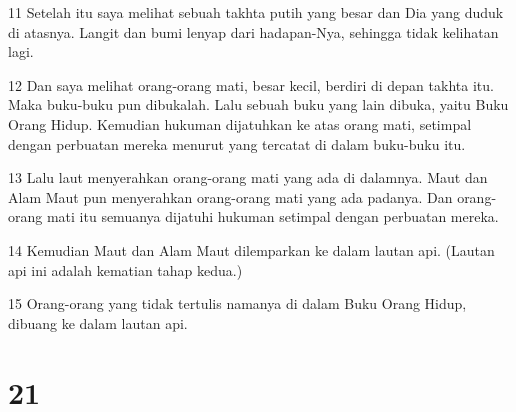 \par 11 Setelah itu saya melihat sebuah takhta putih yang besar dan Dia yang duduk di atasnya. Langit dan bumi lenyap dari hadapan-Nya, sehingga tidak kelihatan lagi.
\par 12 Dan saya melihat orang-orang mati, besar kecil, berdiri di depan takhta itu. Maka buku-buku pun dibukalah. Lalu sebuah buku yang lain dibuka, yaitu Buku Orang Hidup. Kemudian hukuman dijatuhkan ke atas orang mati, setimpal dengan perbuatan mereka menurut yang tercatat di dalam buku-buku itu.
\par 13 Lalu laut menyerahkan orang-orang mati yang ada di dalamnya. Maut dan Alam Maut pun menyerahkan orang-orang mati yang ada padanya. Dan orang-orang mati itu semuanya dijatuhi hukuman setimpal dengan perbuatan mereka.
\par 14 Kemudian Maut dan Alam Maut dilemparkan ke dalam lautan api. (Lautan api ini adalah kematian tahap kedua.)
\par 15 Orang-orang yang tidak tertulis namanya di dalam Buku Orang Hidup, dibuang ke dalam lautan api.

\chapter{21}

